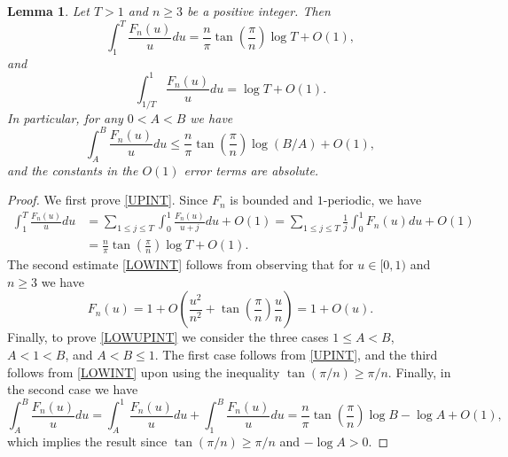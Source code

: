 \documentclass[12pt]{amsart}
\newtheorem{lem}[thm]{Lemma}
\theoremstyle{definition}
\numberwithin{equation}{section}
\begin{document}
\begin{lem}\label{IntegralFN}
Let $T>1$ and $n\geq 3$ be a positive integer. Then
\begin{equation}
\int_1^T \frac{F_{n}(u)}{u} du= \frac{n}{\pi} \tan\left(\frac{\pi}{n}\right) \log T + O(1), \label{UPINT}
\end{equation}
and 
\begin{equation}
\int_{1/T}^1 \frac{F_{n}(u)}{u} du= \log T+ O(1). \label{LOWINT}
\end{equation}
In particular, for any $0<A<B$ we have
\begin{equation}\label{LOWUPINT}
\int_{A}^B \frac{F_{n}(u)}{u} du\leq  \frac{n}{\pi} \tan\left(\frac{\pi}{n}\right)\log(B/A)+ O(1),
\end{equation}
and the constants in the $O(1)$ error terms are absolute. 
\end{lem}
\begin{proof}
We first prove \eqref{UPINT}. Since $F_{n}$ is bounded and $1$-periodic, we have
\begin{align*}
\int_1^T \frac{F_{n}(u)}{u} du 
&= \sum_{1 \leq j \leq T} \int_0^1 \frac{F_{n}(u)}{u+j} du +O(1) = \sum_{1 \leq j \leq T} \frac{1}{j} \int_0^1 F_{n}(u) du + O(1) \\
&= \frac{n}{\pi} \tan\left(\frac{\pi}{n}\right) \log T + O(1). 
\end{align*}
The second estimate \eqref{LOWINT} follows from observing that for $u\in [0, 1)$ and $n\geq 3$ we have
$$ F_n(u)= 1+ O\left(\frac{u^2}{n^2}+\tan\left(\frac{\pi}{n}\right)\frac{u}{n}\right)=1+O(u).$$
Finally, to prove \eqref{LOWUPINT} we consider the three cases $1\leq A<B$, $A<1<B$, and $A<B\leq 1$. The first case follows from \eqref{UPINT}, and the third follows from \eqref{LOWINT} upon using the inequality $\tan(\pi/n)\ge \pi/n$.  Finally, in the second case we have
$$ \int_A^B \frac{F_{n}(u)}{u} du = \int_A^1 \frac{F_{n}(u)}{u} du +\int_1^B\frac{F_{n}(u)}{u} du=\frac{n}{\pi} \tan\left(\frac{\pi}{n}\right)\log B-\log A+ O(1),$$
which implies the result since $\tan(\pi/n)\ge \pi/n$ and $-\log A>0.$
\end{proof}
\end{document}
